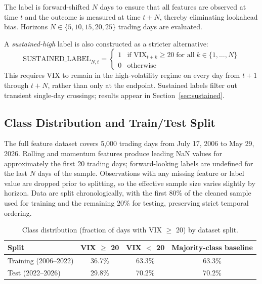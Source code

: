 \documentclass[12pt]{article}
\begin{document}
The label is forward-shifted $N$ days to ensure that all features are observed at time $t$ and the outcome is measured at time $t + N$, thereby eliminating lookahead bias. Horizons $N \in \{5, 10, 15, 20, 25\}$ trading days are evaluated.

A \emph{sustained-high} label is also constructed as a stricter alternative:
\begin{equation}
    \text{SUSTAINED\_LABEL}_{N,t} = \begin{cases} 1 & \text{if } \text{VIX}_{t+k} \geq 20 \;\text{for all}\; k \in \{1, \ldots, N\} \\ 0 & \text{otherwise} \end{cases}
    \label{eq:sustained}
\end{equation}
This requires VIX to remain in the high-volatility regime on every day from $t+1$ through $t+N$, rather than only at the endpoint. Sustained labels filter out transient single-day crossings; results appear in Section~\ref{sec:sustained}.

\subsection{Class Distribution and Train/Test Split}

The full feature dataset covers 5,000 trading days from July 17, 2006 to May 29, 2026. Rolling and momentum features produce leading NaN values for approximately the first 20 trading days; forward-looking labels are undefined for the last $N$ days of the sample. Observations with any missing feature or label value are dropped prior to splitting, so the effective sample size varies slightly by horizon. Data are split chronologically, with the first 80\% of the cleaned sample used for training and the remaining 20\% for testing, preserving strict temporal ordering.

\begin{table}[H]
\centering
\caption{Class distribution (fraction of days with VIX $\geq$ 20) by dataset split.}
\label{tab:class}
\begin{tabular}{lccc}
\toprule
Split & VIX $\geq$ 20 & VIX $<$ 20 & Majority-class baseline \\
\midrule
Training (2006--2022) & 36.7\% & 63.3\% & 63.3\% \\
Test (2022--2026)     & 29.8\% & 70.2\% & 70.2\% \\
\bottomrule
\end{tabular}
\end{table}
\end{document}
